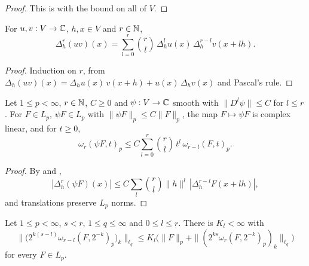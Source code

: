 \begin{proof}
\leanok
This is  with the bound on all of $V$.
\end{proof}

\begin{lemma}
\label{lem:leibniz-differences}
\leanok
{}
For $u, v : V \to \mathbb{C}$, $h, x \in V$ and $r \in \mathbb{N}$,
\[
  \Delta_h^r (u v)(x) = \sum_{l=0}^r \binom{r}{l} \, \Delta_h^l u(x) \, \Delta_h^{r-l} v(x + l h) .
\]
\end{lemma}

\begin{proof}
\leanok
Induction on $r$, from $\Delta_h(u v)(x) = \Delta_h u(x) \, v(x + h) + u(x) \, \Delta_h v(x)$ and
Pascal's rule.
\end{proof}

\begin{lemma}
\label{lem:product-modulus}
\leanok
{}
Let $1 \leq p < \infty$, $r \in \mathbb{N}$, $C \geq 0$ and $\psi : V \to \mathbb{C}$ smooth with
$\|D^l \psi\| \leq C$ for $l \leq r$. For $F \in L_p$, $\psi F \in L_p$ with
$\|\psi F\|_p \leq C \|F\|_p$, the map $F \mapsto \psi F$ is complex linear, and for $t \geq 0$,
\[
  \omega_r(\psi F, t)_p \leq C \sum_{l=0}^r \binom{r}{l} \, t^l \, \omega_{r-l}(F, t)_p .
\]
\end{lemma}

\begin{proof}
\leanok
By  and ,
\[
  |\Delta_h^r(\psi F)(x)| \leq C \sum_l \binom{r}{l} \|h\|^l \, |\Delta_h^{r-l} F(x + l h)| ,
\]
and translations preserve $L_p$ norms.
\end{proof}

\begin{lemma}
\label{lem:lower-order-moduli}
\leanok
{}
Let $1 \leq p < \infty$, $s < r$, $1 \leq q \leq \infty$ and $0 \leq l \leq r$. There is
$K_l < \infty$ with
\[
  \bigl\| \bigl( 2^{k(s-l)} \omega_{r-l}(F, 2^{-k})_p \bigr)_k \bigr\|_{\ell_q}
  \leq K_l \bigl( \|F\|_p + \|(2^{ks} \omega_r(F, 2^{-k})_p)_k\|_{\ell_q} \bigr)
\]
for every $F \in L_p$.
\end{lemma}

